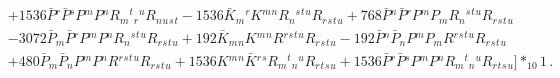 \begin{align}
\nonumber \\ &
  + 1536 \bar{P}{}^{r} \bar{P}{}^{s} P{}^{m} P{}^{n} R{}_{m}{}^{t}{}_{r}{}^{u} R{}_{n}{}_{u}{}_{s}{}_{t}
  - 1536 \bar{K}{}_{m}{}^{r} K{}^{m}{}^{n} R{}_{n}{}^{s}{}^{t}{}^{u} R{}_{r}{}_{s}{}_{t}{}_{u}
  + 768 \bar{P}{}^{n} \bar{P}{}^{r} P{}^{m} P{}_{m} R{}_{n}{}^{s}{}^{t}{}^{u} R{}_{r}{}_{s}{}_{t}{}_{u}
\nonumber \\ &
  - 3072 \bar{P}{}_{m} \bar{P}{}^{r} P{}^{m} P{}^{n} R{}_{n}{}^{s}{}^{t}{}^{u} R{}_{r}{}_{s}{}_{t}{}_{u}
  + 192 \bar{K}{}_{m}{}_{n} K{}^{m}{}^{n} R{}^{r}{}^{s}{}^{t}{}^{u} R{}_{r}{}_{s}{}_{t}{}_{u}
  - 192 \bar{P}{}^{n} \bar{P}{}_{n} P{}^{m} P{}_{m} R{}^{r}{}^{s}{}^{t}{}^{u} R{}_{r}{}_{s}{}_{t}{}_{u}
\nonumber \\ &
  + 480 \bar{P}{}_{m} \bar{P}{}_{n} P{}^{m} P{}^{n} R{}^{r}{}^{s}{}^{t}{}^{u} R{}_{r}{}_{s}{}_{t}{}_{u}
  + 1536 K{}^{m}{}^{n} \bar{K}{}^{r}{}^{s} R{}_{m}{}^{t}{}_{n}{}^{u} R{}_{r}{}_{t}{}_{s}{}_{u}
  + 1536 \bar{P}{}^{r} \bar{P}{}^{s} P{}^{m} P{}^{n} R{}_{m}{}^{t}{}_{n}{}^{u} R{}_{r}{}_{t}{}_{s}{}_{u}
\bigg ] *_{10}1 \,.
\label{St8}
\end{align}

